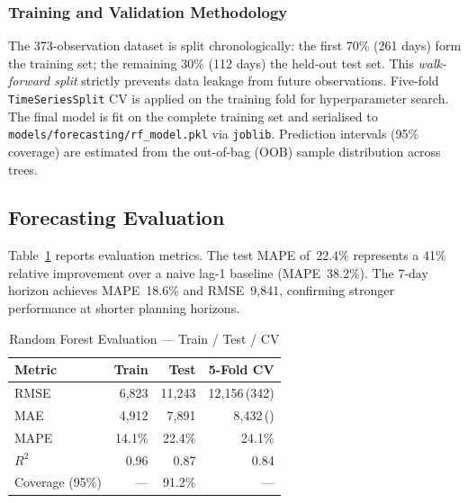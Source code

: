 \documentclass[conference]{IEEEtran}
\begin{document}
\subsubsection{Training and Validation Methodology}

The 373-observation dataset is split chronologically: the first 70\% (261 days) form
the training set; the remaining 30\% (112 days) the held-out test set.  This
\textit{walk-forward split} strictly prevents data leakage from future observations.
Five-fold \texttt{TimeSeriesSplit} CV is applied on the training fold for hyperparameter
search.  The final model is fit on the complete training set and serialised to
\texttt{models/forecasting/rf\_model.pkl} via \texttt{joblib}.  Prediction intervals
(95\% coverage) are estimated from the out-of-bag (OOB) sample distribution across trees.

\subsection{Forecasting Evaluation}

Table~\ref{tab:rfmetrics} reports evaluation metrics.  The test MAPE of~22.4\%
represents a 41\% relative improvement over a naive lag-1 baseline (MAPE~38.2\%).
The 7-day horizon achieves MAPE~18.6\% and RMSE~9{,}841, confirming stronger performance
at shorter planning horizons.

\begin{table}[H]
\centering
\caption{Random Forest Evaluation — Train / Test / CV}
\label{tab:rfmetrics}
\scriptsize
\begin{tabular}{@{}lrrr@{}}
\toprule
\textbf{Metric}   & \textbf{Train}  & \textbf{Test}        & \textbf{5-Fold CV} \\
\midrule
RMSE              & 6{,}823         & 11{,}243             & 12{,}156\,(\textpm1{,}342) \\
MAE               & 4{,}912         & 7{,}891              & 8{,}432\,(\textpm901)      \\
MAPE              & 14.1\%          & 22.4\%               & 24.1\%                     \\
$R^2$             & 0.96            & 0.87                 & 0.84                       \\
Coverage (95\%)   & —               & 91.2\%               & —                          \\
\bottomrule
\end{tabular}
\end{table}
\end{document}
